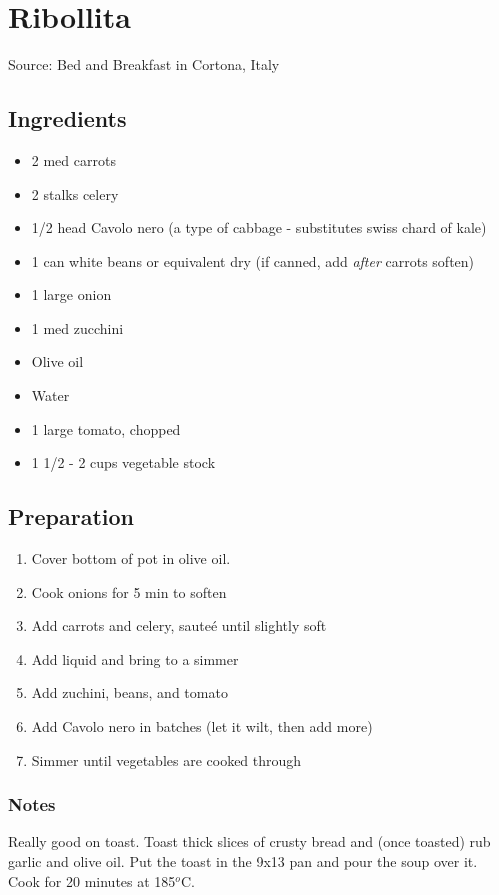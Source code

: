 \section{Ribollita}

\begin{center}
Source: Bed and Breakfast in Cortona, Italy
\end{center}

\subsection{Ingredients}
\begin{itemize}
    \item 2 med carrots
    \item 2 stalks celery
    \item 1/2 head Cavolo nero (a type of cabbage - substitutes swiss chard of kale)
    \item 1 can white beans or equivalent dry (if canned, add \emph{after} carrots soften)
    \item 1 large onion
    \item 1 med zucchini
    \item Olive oil
    \item Water
    \item 1 large tomato, chopped
    \item 1 1/2 - 2 cups vegetable stock
\end{itemize}

\subsection{Preparation}
\begin{enumerate}
    \item Cover bottom of pot in olive oil.
    \item Cook onions for 5 min to soften
    \item Add carrots and celery, saute\'{e} until slightly soft
    \item Add liquid and bring to a simmer
    \item Add zuchini, beans, and tomato
    \item Add Cavolo nero in batches (let it wilt, then add more)
    \item Simmer until vegetables are cooked through
\end{enumerate}

\subsubsection{Notes}
Really good on toast.
Toast thick slices of crusty bread and (once toasted) rub garlic and olive oil.
Put the toast in the 9x13 pan and pour the soup over it.
Cook for 20 minutes at 185$^o$C.
